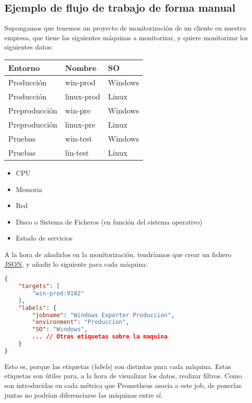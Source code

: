 \subsection*{Ejemplo de flujo de trabajo de forma manual}
\label{sec:flujo_manual}

Supongamos que tenemos un proyecto de monitorización de un cliente en nuestra empresa, que tiene las siguientes máquinas a monitorizar, y quiere monitorizar los siguientes datos:

\begin{multicols}{2}
\begin{tabular}[h]{l|l|l}
    \textbf{Entorno} & \textbf{Nombre} & \textbf{SO} \\
    \hline
    \hline
    Producción & win-prod & Windows \\
    \hline
    Producción & linux-prod & Linux \\
    \hline
    Preproducción & win-pre & Windows \\
    \hline
    Preproducción & linux-pre & Linux \\
    \hline
    Pruebas & win-test & Windows \\
    \hline
    Pruebas & lin-test & Linux \\
\end{tabular}
\columnbreak   
\begin{itemize}
    \item CPU
    \item Memoria
    \item Red
    \item Disco o Sistema de Ficheros (en función del sistema operativo)
    \item Estado de servicios
\end{itemize}
\end{multicols}

A la hora de añadirlos en la monitorización, tendríamos que crear un fichero \url{JSON}, y añadir lo siguiente para cada máquina:
\begin{lstlisting}[language=json]
{
    "targets": [
        "win-prod:9182"
    ],
    "labels": {
        "jobname": "Windows Exporter Produccion",
        "environment": "Produccion",
        "SO": "Windows",
        ... // Otras etiquetas sobre la maquina
    }
}
\end{lstlisting}

Esto es, porque las etiquetas (\textit{labels}) son distintas para cada máquina. Estas etiquetas son útiles para, a la hora de visualizar los datos, realizar filtros. Como son introducidas en cada métrica que Prometheus asocia a este job, de ponerlas juntas no podrían diferenciarse las máquinas entre sí.

